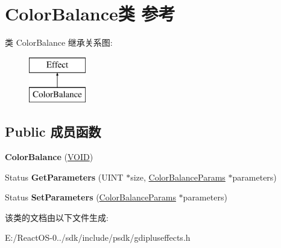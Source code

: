 \hypertarget{class_color_balance}{}\section{Color\+Balance类 参考}
\label{class_color_balance}
类 Color\+Balance 继承关系图\+:\begin{figure}[H]
\begin{center}
\leavevmode
\includegraphics[height=2.000000cm]{class_color_balance}
\end{center}
\end{figure}
\subsection*{Public 成员函数}
\begin{DoxyCompactItemize}
\item 
\mbox{\label{class_color_balance_a0a8f126a0ae1ac071d7d61b2e4e028fd}} 
{\bfseries Color\+Balance} (\hyperlink{interfacevoid}{V\+O\+ID})
\item 
\mbox{\label{class_color_balance_afbbd333102560cb42e5a612012fbec71}} 
Status {\bfseries Get\+Parameters} (U\+I\+NT $\ast$size, \hyperlink{struct_color_balance_params}{Color\+Balance\+Params} $\ast$parameters)
\item 
\mbox{\label{class_color_balance_a06466af5a8bdedb5bc7cdf818088c008}} 
Status {\bfseries Set\+Parameters} (\hyperlink{struct_color_balance_params}{Color\+Balance\+Params} $\ast$parameters)
\end{DoxyCompactItemize}


该类的文档由以下文件生成\+:\begin{DoxyCompactItemize}
\item 
E\+:/\+React\+O\+S-\/0../sdk/include/psdk/gdipluseffects.\+h\end{DoxyCompactItemize}
